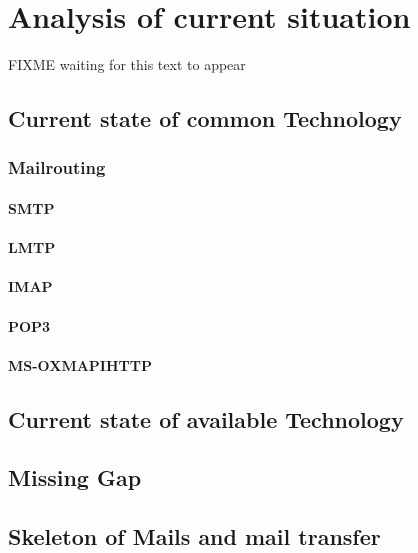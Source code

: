 \chapter{Analysis of current situation}\label{chap:analysis}
FIXME waiting for this text to appear
\section{Current state of common Technology}
\subsection{Mailrouting}
\subsubsection{SMTP}
\subsubsection{LMTP}
\subsubsection{IMAP}
\subsubsection{POP3}
\subsubsection{MS-OXMAPIHTTP}
\section{Current state of available Technology}
\section{Missing Gap}
\section{Skeleton of Mails and mail transfer}



